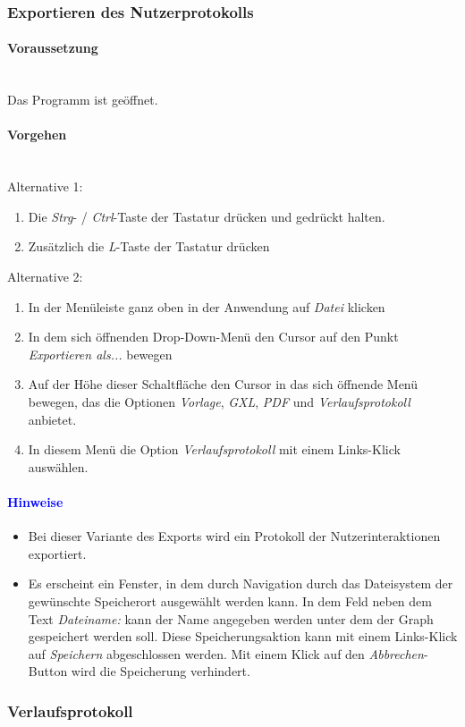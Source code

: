 \documentclass[enabledeprecatedfontcommands,fontsize=11pt,paper=a4,twoside]{scrartcl}
\newcounter{one}
\newcommand*{\hint}{\paragraph{\textcolor{blue}{Hinweise}}}
\newcommand*{\condition}{\paragraph{Voraussetzung}$\;$ \vspace{0.2cm}\\}
\newcommand*{\actions}{\paragraph{Vorgehen} $\;$\vspace{0.2cm}\\}
\begin{document}
							\newpage
		\subsubsection{Exportieren des Nutzerprotokolls}
		\condition 	
		Das Programm ist geöffnet.
		\actions
		Alternative 1:
		\begin{enumerate}
				\item Die \textit{Strg}- / \textit{Ctrl}-Taste der Tastatur drücken und gedrückt halten.
				\item Zusätzlich die \textit{L}-Taste der Tastatur drücken
		\end{enumerate}				
		Alternative 2:
		\begin{enumerate}
				\item In der Menüleiste ganz oben in der Anwendung auf \textit{Datei} klicken 
				\item In dem sich öffnenden Drop-Down-Menü den Cursor auf den Punkt \textit{Exportieren als...} bewegen
				\item Auf der Höhe dieser Schaltfläche den Cursor in das sich öffnende Menü bewegen, das die Optionen \textit{Vorlage}, \textit{GXL}, \textit{PDF} und \textit{Verlaufsprotokoll} anbietet.
				\item In diesem Menü die Option \textit{Verlaufsprotokoll} mit einem Links-Klick auswählen.
		\end{enumerate}		
		\hint
		\begin{itemize}
				\item Bei dieser Variante des Exports wird ein Protokoll der Nutzerinteraktionen exportiert.
				\item Es erscheint ein Fenster, in dem durch Navigation durch das Dateisystem der gewünschte Speicherort ausgewählt werden kann. In dem Feld neben dem Text \textit{Dateiname:} kann der Name angegeben werden unter dem der Graph gespeichert werden soll. Diese Speicherungsaktion kann mit einem Links-Klick auf \textit{Speichern} abgeschlossen werden. Mit einem Klick auf den \textit{Abbrechen}-Button wird die Speicherung verhindert.
		\end{itemize}


		
		
		
		
							\newpage
		\subsubsection{Verlaufsprotokoll}
\end{document}
